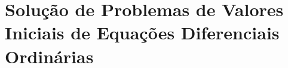 \chapter{Solução de Problemas de Valores Iniciais de Equações Diferenciais Ordinárias}













%

%


